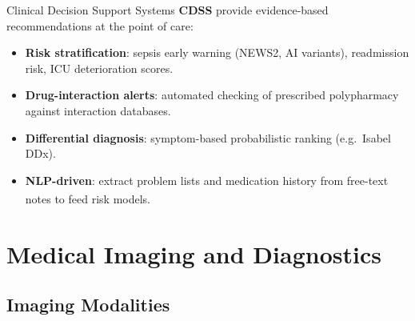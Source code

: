 \begin{v3topic}{Clinical Decision Support Systems}
    \textbf{CDSS} provide evidence-based recommendations at the point of care:
    \begin{itemize}
        \item \textbf{Risk stratification}: sepsis early warning (NEWS2, AI variants), readmission risk, ICU deterioration scores.
        \item \textbf{Drug-interaction alerts}: automated checking of prescribed polypharmacy against interaction databases.
        \item \textbf{Differential diagnosis}: symptom-based probabilistic ranking (e.g.\ Isabel DDx).
        \item \textbf{NLP-driven}: extract problem lists and medication history from free-text notes to feed risk models.\textsuperscript{\cite[][p.~465]{juhnArtificialIntelligenceNLP2020}}
    \end{itemize}
\end{v3topic}

\section{Medical Imaging and Diagnostics}

\subsection{Imaging Modalities}

